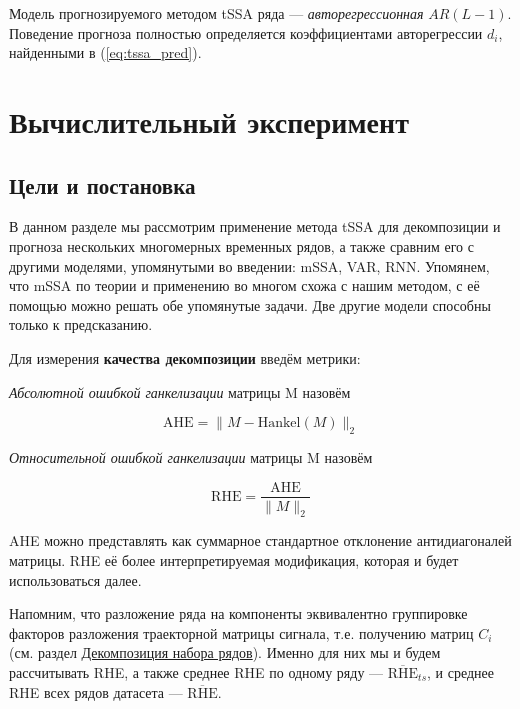 	    	 \begin{Th}
	    	 	Модель прогнозируемого методом tSSA ряда --- \textit{авторегрессионная} $ AR(L - 1) $. Поведение прогноза полностью определяется коэффициентами авторегрессии $ d_i $, найденными в (\ref{eq:tssa_pred}).
	    	 \end{Th}
	    
	\section{Вычислительный эксперимент}	
	
		\subsection*{Цели и постановка}
	
			В данном разделе мы рассмотрим применение метода tSSA для декомпозиции и прогноза нескольких многомерных временных рядов, а также сравним его с другими моделями, упомянутыми во введении: mSSA, VAR, RNN. Упомянем, что mSSA по теории и применению во многом схожа с нашим методом, с её помощью можно решать обе упомянутые задачи. Две другие модели способны только к предсказанию.
		
			Для измерения \textbf{качества декомпозиции} введём метрики:
			
			\begin{Def}
				\emph{Абсолютной ошибкой ганкелизации} матрицы M назовём 
				
				\[
					\text{AHE} = \lVert M - \text{Hankel}(M) \rVert_2
				\] 
				
			\end{Def}	
			
			\begin{Def}		
				
				\emph{Относительной ошибкой ганкелизации} матрицы M назовём 
				
				\[
				\text{RHE} = \frac{\text{AHE}}{\lVert M \rVert_2} 
				\] 		
				
			\end{Def}
			
			AHE можно представлять как суммарное стандартное отклонение антидиагоналей матрицы. RHE её более интерпретируемая модификация, которая и будет использоваться далее. 
			
			Напомним, что разложение ряда на компоненты эквивалентно группировке факторов разложения траекторной матрицы сигнала, т.е. получению матриц $ C_i $ (см. раздел \hyperref[sec:decomposition]{Декомпозиция набора рядов}). Именно для них мы и будем рассчитывать RHE, а также среднее RHE по одному ряду --- $ \overline{\text{RHE}}_{ts} $, и среднее RHE всех рядов датасета --- $ \overline{\text{RHE}} $.
			
